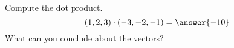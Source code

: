 \begin{problem}
Compute the dot product.
\[
(1,2,3)\cdot(-3,-2,-1)=\answer{-10}
\]
What can you conclude about the vectors?
\begin{multipleChoice}
\end{multipleChoice}
\end{problem}